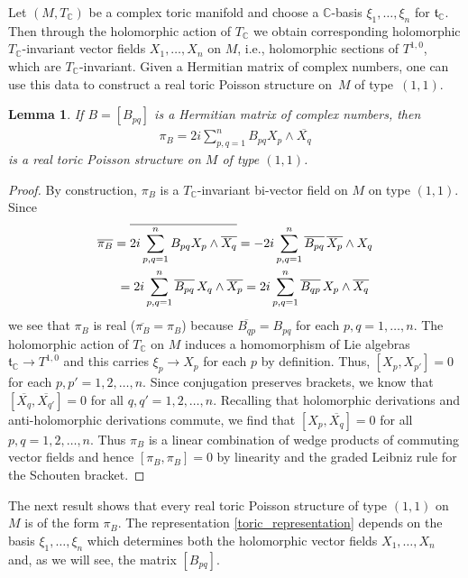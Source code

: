 \documentclass[10pt,a4paper]{amsart}
\numberwithin{equation}{section}
\newtheorem{Lemma}[Theorem]{Lemma}
\begin{document}
Let $(M,T_{\mathbb C})$ be a complex toric manifold and choose a ${\mathbb C}$-basis $\xi_1,\dots,\xi_n$ for ${\mathfrak t}_{\mathbb C}$. Then through the holomorphic action of $T_{\mathbb C}$ we obtain corresponding holomorphic $T_{\mathbb C}$-invariant vector f\/ields $X_1,\dots,X_n$ on $M$, i.e., holomorphic sections of $T^{1,0}$, which are $T_{\mathbb C}$-invariant. Given a Hermitian matrix of complex numbers, one can use this data to construct a real toric Poisson structure on~$M$ of type~$(1,1)$.

\begin{Lemma} \label{model_for_toric_PS_lemma}
If $B=[B_{pq}]$ is a Hermitian matrix of complex numbers, then
\begin{gather}\label{toric_representation}
\pi_B=2i\sum_{p,q=1}^n B_{pq}X_p\wedge \overline{X_q}
\end{gather}
is a real toric Poisson structure on $M$ of type $(1,1)$.
\end{Lemma}
\begin{proof}
By construction, $\pi_B$ is a $T_{\mathbb C}$-invariant bi-vector f\/ield on $M$ on type $(1,1)$. Since
\begin{gather*}
\overline{\pi_B} =  \overline{2i\sum_{p,q=1}^n B_{pq}X_p\wedge \overline{X_q}} = -2i\sum_{p,q=1}^n \overline{B_{pq}}\,\overline{X_p}\wedge X_q \\
\hphantom{\overline{\pi_B}}{} = 2i\sum_{p,q=1}^n \overline{B_{pq}}\, X_q\wedge \overline{X_p} = 2i\sum_{p,q=1}^n \overline{B_{qp}}\,X_p\wedge \overline{X_q} \end{gather*}
we see that $\pi_B$ is real ($\overline{\pi_B}=\pi_B$) because $\overline{B_{qp}}=B_{pq}$ for each $p,q=1,\dots,n$. The holomorphic action of $T_{\mathbb C}$ on $M$ induces a homomorphism of Lie algebras ${\mathfrak t}_{\mathbb C}\to T^{1,0}$ and this carries $\xi_p\to X_p$ for each $p$ by def\/inition. Thus, $[X_p,X_{p'}]=0$ for each $p,p'=1,2,\dots,n$. Since conjugation preserves brackets, we know that $[\overline{X_q},\overline{X_{q'}}]=0$ for all $q,q'=1,2,\dots,n$. Recalling that holomorphic derivations and anti-holomorphic derivations commute, we f\/ind that $[X_p,\overline{X_q}]=0$ for all $p,q=1,2,\dots,n$. Thus $\pi_B$ is a linear combination of wedge products of commuting vector f\/ields and hence $[\pi_B,\pi_B]=0$ by linearity and the graded Leibniz rule for the Schouten bracket.
\end{proof}

The next result shows that every real toric Poisson structure of type $(1,1)$ on $M$ is of the form $\pi_B$. The representation \eqref{toric_representation} depends on the basis $\xi_1,\dots,\xi_n$ which determines both the holomorphic vector f\/ields $X_1,\dots,X_n$ and, as we will see, the matrix $[B_{pq}]$.
\end{document}
